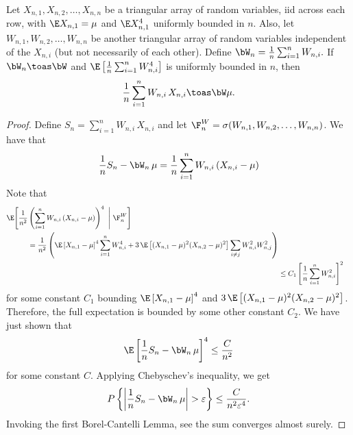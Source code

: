\begin{proposition}\label{P:weighted-slln}
    Let $X_{n,1}, X_{n,2}, \ldots, X_{n,n}$ be a triangular array of random
    variables, iid across each row, with $\E X_{n,1} = \mu$ and 
    $\E X_{n,1}^4$  uniformly bounded in $n$.
    Also, let $W_{n,1}, W_{n,2}, \ldots, 
    W_{n,n}$ be another triangular array of random variables independent of 
    the $X_{n,i}$ (but not necessarily of each other).  Define 
    \(
        \bW_n = \frac{1}{n} \sum_{i=1}^n W_{n,i}.
    \) 
    If $\bW_n \toas \bW$ and 
    $\E \left[ \frac{1}{n} \sum_{i=1}^n W_{n,i}^4 \right]$ is uniformly 
    bounded in $n$, then
    \begin{equation}
        \frac{1}{n} \sum_{i=1}^n W_{n,i} \, X_{n,i} \toas \bW \mu.
    \end{equation}
\end{proposition}
\begin{proof}
    Define $S_n = \sum_{i=1}^n W_{n,i} \, X_{n,i}$ and let
    $\F^W_n = \sigma( W_{n,1}, W_{n,2}, \ldots, W_{n,n})$.  We have that
    \[
        \frac{1}{n} S_n - \bW_n \, \mu
        = 
       \frac{1}{n}
       \sum_{i=1}^n
           W_{n,i} \,
           (X_{n,i} - \mu) 
    \]
    Note that
    \begin{align*}
        \begin{split}
        \E \Bigg[
            \frac{1}{n^2}
            &\left(
                \sum_{i=1}^n
                    W_{n,i} \,
                    (X_{n,i} - \mu) 
            \right)^4
        \,\, \Bigg| \,\,
            \F^W_n
        \Bigg] \\
        &= \frac{1}{n^2} \left(
               \E \left[ X_{n,1} - \mu \right]^4
               \sum_{i=1}^n
                   W_{n,i}^4
               +
               3 \, \E \left[
                   (X_{n,1} - \mu)^2 (X_{n,2} - \mu)^2
               \right]
               \sum_{i \neq j}
                   W_{n,i}^2 W_{n,j}^2
           \right)
        \end{split} \\
        &\leq C_1 \left[
            \frac{1}{n}
            \sum_{i=1}^n W_{n,i}^2
        \right]^2
    \end{align*}
    for some constant $C_1$ bounding $\E \left[ X_{n,1} - \mu \right]^4$
    and $3 \, \E \left[ (X_{n,1} - \mu)^2 (X_{n,2} - \mu)^2 \right]$.
    Therefore, the full expectation is bounded by some other constant $C_2$.  
    We have just shown that
    \[
        \E \left[ 
            \frac{1}{n} S_n - \bW_n \, \mu
           \right]^4
        \leq \frac{C}{n^2}
    \]
    for some constant $C$.  Applying Chebyschev's inequality, we get
    \[
        P \left\{
            \left|
                \frac{1}{n} S_n - \bW_n \, \mu
            \right|
            > \varepsilon
        \right\}
        \leq \frac{C}{n^2 \varepsilon^4}.
    \]
    Invoking the first Borel-Cantelli Lemma, see the sum converges
    almost surely.
\end{proof}

